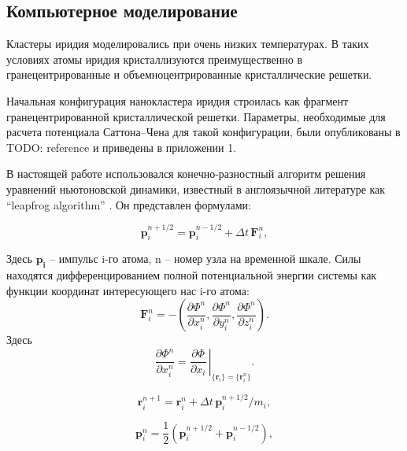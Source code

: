 \subsection{Компьютерное моделирование}
\label{sec:2b}

Кластеры иридия моделировались при очень низких температурах. %
В таких условиях атомы иридия кристаллизуются преимущественно в гранецентрированные
и объемноцентрированные кристаллические решетки.

Начальная конфигурация нанокластера иридия строилась как фрагмент гранецентрированной
кристаллической решетки. Параметры, необходимые для расчета потенциала Саттона--Чена
для такой конфигурации, были опубликованы в TODO: reference и приведены в приложении 1. 

В настоящей работе использовался конечно-разностный алгоритм решения уравнений ньютоновской динамики,
известный в англоязычной литературе как ``leapfrog algorithm'' \cite{md0}. Он представлен формулами:

\begin{equation}
\label{LF1}
\mathbf{p}^{n+1/2}_i = \mathbf{p}^{n-1/2}_i + \Delta t \, \mathbf{F}^{n}_i,
\end{equation}

Здесь $\mathbf{p_i}$ -- импульс i-го атома, n -- номер узла на временной шкале. Силы находятся дифференцированием полной потенциальной энергии системы как функции координат интересующего нас i-го атома:
\begin{equation}
\label{LF:Force}
\mathbf{F}^{n}_i = - \left(\dfrac{\partial {\Phi}^n}{\partial x^{n}_i}, \dfrac{\partial {\Phi}^n}{\partial y^{n}_i}, \dfrac{\partial {\Phi}^n}{\partial z^{n}_i} \right).
\end{equation}
Здесь
\begin{equation}
\dfrac{\partial {\Phi}^n}{\partial x^{n}_i} = \left. \dfrac{\partial \Phi}{\partial x_i} \, \right|_{\{\mathbf{r}_i\} = \{\mathbf{r}^{n}_i\}}.
\end{equation}

\begin{equation}
\label{LF2}
\mathbf{r}^{n+1}_i = \mathbf{r}^{n}_i + \Delta t \, \mathbf{p}^{n+1/2}_i/m_i,
\end{equation}

\begin{equation}
\label{LF3}
\mathbf{p}^{n}_i = \dfrac{1}{2} \left(\mathbf{p}^{n+1/2}_i +
\mathbf{p}^{n-1/2}_i \right),
\end{equation}

